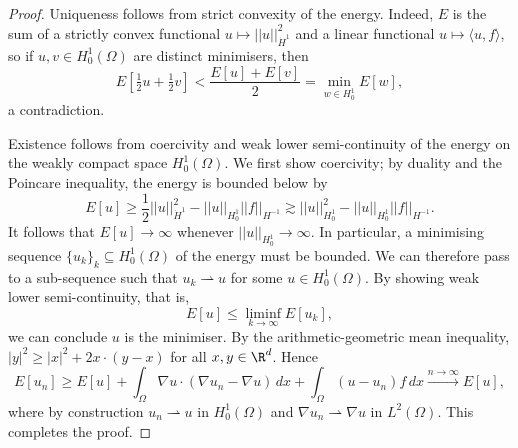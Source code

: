 \documentclass[reqno]{amsart}
\theoremstyle{definition}
\theoremstyle{remark}
\begin{document}
\begin{proof}
	Uniqueness follows from strict convexity of the energy. Indeed, $E$ is the sum of a strictly convex functional $u \mapsto ||u||_{\dot H^1}^2$ and a linear functional $u \mapsto \langle u, f\rangle$, so if $u, v \in H^1_0 (\Omega)$ are distinct minimisers, then 
		\[ E[\tfrac12 u + \tfrac12 v] < \frac{E[u] + E[v]}{2} = \min_{w \in H^1_0} E[w], \]
	a contradiction. 	
	
	Existence follows from coercivity and weak lower semi-continuity of the energy on the weakly compact space $H^1_0 (\Omega)$. We first show coercivity; by duality and the Poincare inequality, the energy is bounded below by 
		\[ E[u] \geq \frac12 ||u||_{\dot H^1}^2 - ||u||_{H^1_0} ||f||_{H^{-1}} \gtrsim ||u||_{H^1_0}^2 - ||u||_{H^1_0} ||f||_{H^{-1}}. \]
	It follows that $E[u] \to \infty$ whenever $||u||_{H^1_0} \to \infty$. In particular, a minimising sequence $\{ u_k \}_k \subseteq H^1_0 (\Omega)$ of the energy must be bounded. We can therefore pass to a sub-sequence such that $u_k \rightharpoonup u$ for some $u \in H^1_0 (\Omega)$. By showing weak lower semi-continuity, that is, 
		\[ E[u] \leq \liminf_{k \to \infty} E[u_k] ,\]
	we can conclude $u$ is the minimiser. By the arithmetic-geometric mean inequality, $|y|^2 \geq |x|^2 + 2 x \cdot (y - x)$ for all $x,y \in \R^d$. Hence
		\[ E[u_n] \geq E[u] + \int_\Omega \nabla u \cdot (\nabla u_n - \nabla u) \, dx + \int_\Omega (u - u_n ) f  \, dx \overset{n \to \infty}{\longrightarrow} E[u],  \]
	where by construction $u_n \rightharpoonup u$ in $H^1_0 (\Omega)$ and $\nabla u_n \rightharpoonup \nabla u$ in $L^2 (\Omega)$. This completes the proof.
\end{proof}




\end{document}
